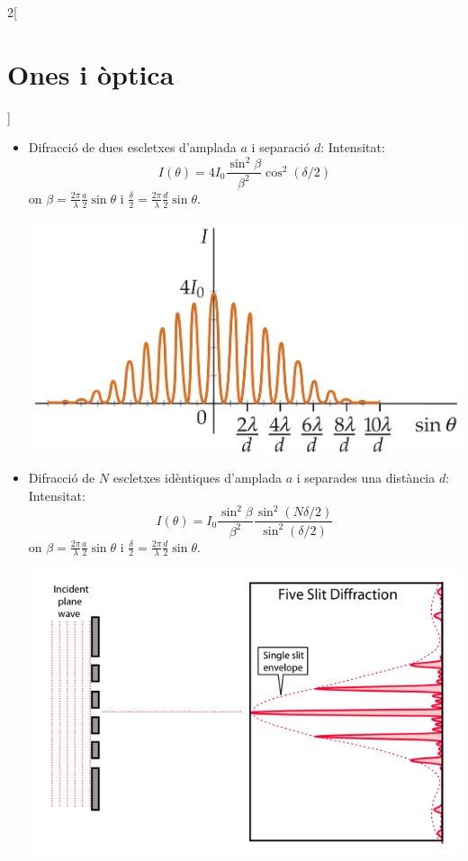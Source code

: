 \documentclass[../../../main.tex]{subfiles}
\begin{document}
\begin{multicols}{2}[\section{Ones i òptica}]
\begin{itemize}
\begin{itemize}
        \item Difracció de dues escletxes d'am\-pla\-da $a$ i separació $d$:\newline
        Intensitat: $$I(\theta)=4I_0\frac{\sin^2\beta}{\beta^2}\cos^2(\delta/2)$$ {\footnotesize on $\beta=\frac{2\pi}{\lambda}\frac{a}{2}\sin\theta$ i $\frac{\delta}{2}=\frac{2\pi}{\lambda}\frac{d}{2}\sin\theta$.}\newline      \begin{minipage}{\linewidth}
            \includegraphics[width=\linewidth]{Physics/1st/Waves_and_optics/Images/dif2.jpg} 
        \end{minipage}
        \item Difracció de $N$ escletxes i\-dèn\-ti\-ques d'amplada $a$ i separades una distància $d$:\newline
        Intensitat: $$I(\theta)=I_0\frac{\sin^2\beta}{\beta^2}\frac{\sin^2(N\delta/2)}{\sin^2(\delta/2)}$$ {\footnotesize on $\beta=\frac{2\pi}{\lambda}\frac{a}{2}\sin\theta$ i $\frac{\delta}{2}=\frac{2\pi}{\lambda}\frac{d}{2}\sin\theta$.}\newline
        \begin{minipage}{\linewidth}
    \includegraphics[width=\linewidth]{Physics/1st/Waves_and_optics/Images/difn.png} 

\end{minipage}
\end{itemize}
\end{itemize}
\end{multicols}
\end{document}

